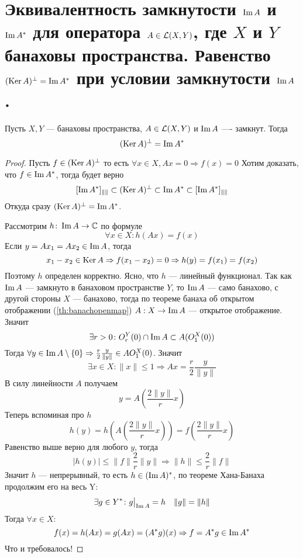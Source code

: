\newpage
\section{Эквивалентность замкнутости $\operatorname{Im} A$ и $\operatorname{Im} A^*$ для оператора $A \in \mathcal{L}(X,Y)$, где $X$ и $Y$ банаховы пространства. Равенство $(\operatorname{Ker} A)^\perp  = \operatorname{Im} A^*$ при условии замкнутости $\operatorname{Im} A$.}

\begin{theorem}\label{th:frspirit}
	Пусть $X,Y$ --- банаховы пространства, $A \in \mathcal{L}(X,Y)$ и $\operatorname{Im} A$ ---- замкнут. Тогда 
	$$
	(\operatorname{Ker} A)^\perp = \operatorname{Im} A^*
	$$
\end{theorem}
\begin{proof}
	Пусть $f\in (\operatorname{Ker} A)^\perp$ то есть $\forall x \in X, Ax = 0 \Rightarrow f(x) = 0$
	Хотим доказать, что $f \in \operatorname{Im} A^*$, тогда будет верно
	$$
	[\operatorname{Im} A^*]_{\|\|} \subset (\operatorname{Ker} A)^\perp \subset \operatorname{Im} A^* \subset [\operatorname{Im} A^*]_{\|\|}
	$$
	Откуда сразу $(\operatorname{Ker} A)^\perp = \operatorname{Im} A^*$.
	
	Рассмотрим $h \colon \operatorname{Im} A \to \mathbb{C}$ по формуле
	$$
	\forall x \in X  \colon h(Ax) = f(x) 
	$$
	Если $y = Ax_1 = Ax_2 \in \operatorname{Im} A$, тогда 
	$$
	x_1 - x_2 \in \operatorname{Ker} A \Rightarrow f(x_1 - x_2)  = 0 \Rightarrow h(y) = f(x_1) = f(x_2)
	$$
	Поэтому $h$ определен корректно. Ясно, что $h$ --- линейный функционал. Так как $\operatorname{Im} A$ --- замкнуто в банаховом пространстве $Y$, то $\operatorname{Im} A$ --- само банахово, с другой стороны $X$ --- банахово, тогда по теореме банаха об открытом отображении (\ref{th:banachopenmap}) $A : X \to \operatorname{Im} A$ --- открытое отображение. Значит 
	$$
	\exists r > 0 \colon O_r^Y(0) \cap \operatorname{Im} A \subset A(O_1^X(0))
	$$
	Тогда $\forall y \in \operatorname{Im} A \setminus \{0\} \Rightarrow  \frac{r}{2}\frac{y}{\|y\|} \in AO_1^X(0)$. Значит
	$$
	\exists x \in X \colon \|x\| \leq 1 \Rightarrow Ax = \frac{r}{2}\frac{y}{\|y\|}
	$$
	В силу линейности $A$ получаем
	$$
	y = A\left(\frac{2\|y\|}{r}x\right)
	$$
	Теперь вспоминая про $h$ 
	$$
	h(y) = h\left(A\left(\frac{2\|y\|}{r}x\right)\right) = f\left(\frac{2\|y\|}{r}x\right)
	$$
	Равенство выше верно для любого $y$, тогда
	$$
	|h(y)| \leq \|f\|\frac{2}{r}\|y\| \Rightarrow \|h\| \leq \frac{2}{r}\|f\|
	$$
	Значит $h$ --- непрерывный, то есть $h \in (\operatorname{Im} A)^*$, по теореме Хана-Банаха продолжим его на весь Y:
	$$
	\exists g \in Y^* \colon g\big|_{\operatorname{Im} A} = h \quad \|g\| = \|h\| 
	$$
	Тогда $\forall x \in X$:
	$$
	f(x) = h(Ax) = g(Ax) = (A^*g)(x) \Rightarrow f = A^*g \in \operatorname{Im} A^*
	$$
	Что и требовалось!
\end{proof}

